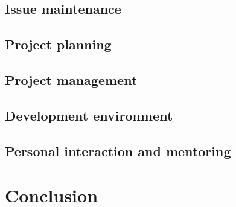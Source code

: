 \documentclass[12pt]{scrartcl}
\let\oldsection\section
\renewcommand\section{\clearpage\oldsection}
\begin{document}
\subsection{Issue maintenance}

\subsection{Project planning}

\subsection{Project management}

\subsection{Development environment}
\label{feedback_development_environment}

\subsection{Personal interaction and mentoring}

\section{Conclusion}

\printbibliography
\end{document}
